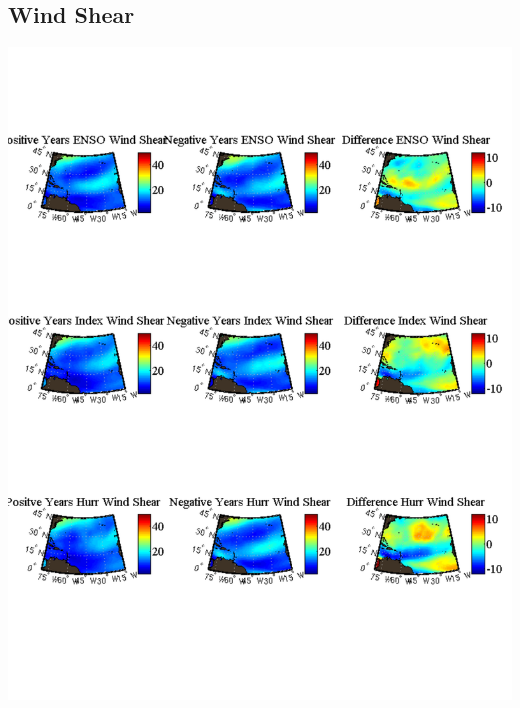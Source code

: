 \documentclass[11pt]{article}
\begin{document}
\subsection{Wind Shear}
\includegraphics[scale=.75]{images/compareWindShearComposites.pdf}

\newpage
\end{document}
